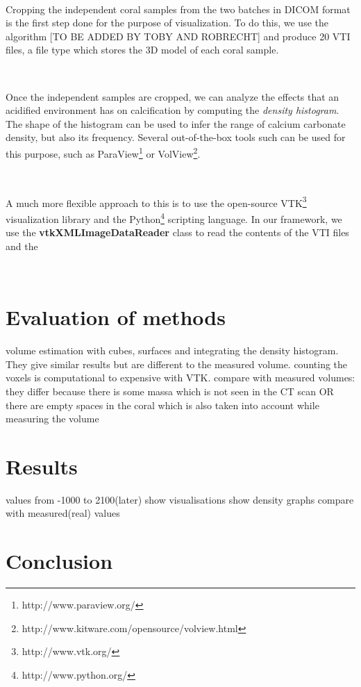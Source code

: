 \documentclass[12pt]{article}
\begin{document}
\

Cropping the independent coral samples from the two batches in DICOM format is the first step done for the purpose of visualization. To do this, we use the algorithm [TO BE ADDED BY TOBY AND ROBRECHT] and produce 20 VTI files, a file type which stores the 3D model of each coral sample.

\

Once the independent samples are cropped, we can analyze the effects that an acidified environment has on calcification by computing the \emph{density histogram}. The shape of the histogram can be used to infer the range of calcium carbonate density, but also its frequency. Several out-of-the-box tools such can be used for this purpose, such as ParaView\footnote{http://www.paraview.org/} or VolView\footnote{http://www.kitware.com/opensource/volview.html}.

\

A much more flexible approach to this is to use the open-source VTK\footnote{http://www.vtk.org/} visualization library and the Python\footnote{http://www.python.org/} scripting language. In our framework, we use the {\bf vtkXMLImageDataReader} class to read the contents of the VTI files and the 

\

\section{Evaluation of methods}
volume estimation with cubes, surfaces and integrating the density histogram. They give similar results but are different to the measured volume. counting the voxels is computational to expensive with VTK.
compare with measured volumes:
they differ because there is some massa which is not seen in the CT scan OR there are empty spaces in the coral which is also taken into account while measuring the volume

\section{Results}
values from -1000 to 2100(later)
show visualisations
show density graphs
compare with measured(real) values
\section{Conclusion}
\end{document}
